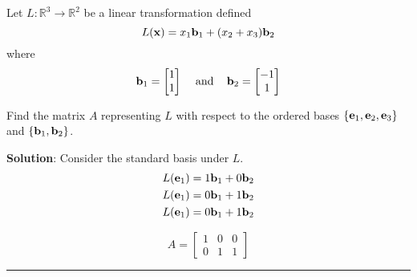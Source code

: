\begin{example}
Let $L:\mathbb{R}^3 \to \mathbb{R}^2$ be a linear transformation defined
\[ L({\bf x}) = x_1 {\bf b}_1 +(x_2+x_3) {\bf b}_2  \]
where 
\[  {\bf b}_1 = \begin{bmatrix} 1 \\ 1 \end{bmatrix}  \;\;\; \text{ and } \;\;\;    {\bf b}_2 = \begin{bmatrix} -1 \\ 1 \end{bmatrix}     \]


Find the matrix $A$ representing $L$ with respect to the ordered bases $\{ {\bf e}_1, {\bf e}_2, {\bf e}_3 \}$ and $\{  {\bf b}_1, {\bf b}_2 \}$.

\textbf{Solution}:  Consider the standard basis under $L$.
\begin{align*}
	L({\bf e}_1) &= 1 {\bf b}_1 + 0 {\bf b}_2 \\
	L({\bf e}_1) &= 0 {\bf b}_1 + 1 {\bf b}_2 \\
	L({\bf e}_1) &= 0 {\bf b}_1 + 1 {\bf b}_2 
\end{align*}

\[ A = \begin{bmatrix} 1  &  0  &  0 \\ 0   &  1   &  1  \end{bmatrix} \]
 
\end{example}




















\rule[0.01in]{\textwidth}{0.0025in}





